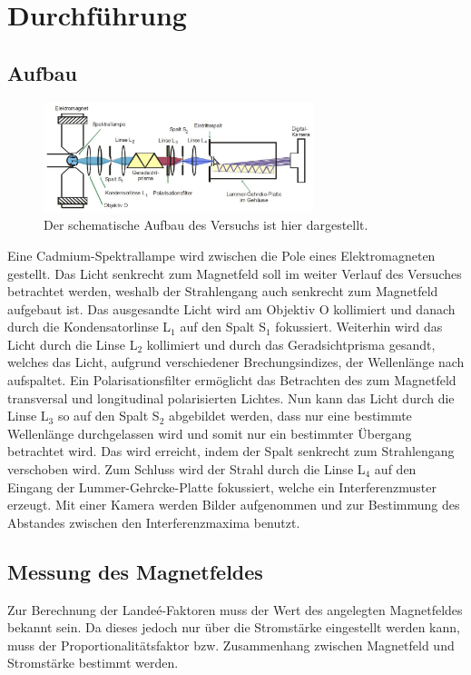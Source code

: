 \newpage
\section{Durchführung}
\label{sec:Durchfuehrung}
\subsection{Aufbau}
    \begin{figure}[h]
        \center
        \includegraphics[width=0.7\textwidth]{bilder/aufbau.jpeg}
        \caption{Der schematische Aufbau des Versuchs ist hier dargestellt. \cite{tu_dortmund_versuchsanleitung_2021}}
        \label{fig:aufbau}
    \end{figure}
    \FloatBarrier

    Eine Cadmium-Spektrallampe wird zwischen die Pole eines Elektromagneten gestellt.
    Das Licht senkrecht zum Magnetfeld soll im weiter Verlauf des Versuches betrachtet werden, weshalb der Strahlengang auch senkrecht zum Magnetfeld aufgebaut ist.
    Das ausgesandte Licht wird am Objektiv O kollimiert und danach durch die Kondensatorlinse L$_1$ auf den Spalt S$_1$ fokussiert.
    Weiterhin wird das Licht durch die Linse L$_2$ kollimiert und durch das Geradsichtprisma gesandt, welches das Licht, aufgrund verschiedener Brechungsindizes, der Wellenlänge nach aufspaltet.
    Ein Polarisationsfilter ermöglicht das Betrachten des zum Magnetfeld transversal und longitudinal polarisierten Lichtes.
    Nun kann das Licht durch die Linse L$_3$ so auf den Spalt S$_2$ abgebildet werden, dass nur eine bestimmte Wellenlänge durchgelassen wird und somit nur ein bestimmter Übergang betrachtet wird.
    Das wird erreicht, indem der Spalt senkrecht zum Strahlengang verschoben wird.
    Zum Schluss wird der Strahl durch die Linse L$_4$ auf den Eingang der Lummer-Gehrcke-Platte fokussiert, welche ein Interferenzmuster erzeugt.
    Mit einer Kamera werden Bilder aufgenommen und zur Bestimmung des Abstandes zwischen den Interferenzmaxima benutzt.

\subsection{Messung des Magnetfeldes}
\label{sec:BFeld}
    Zur Berechnung der Landeé-Faktoren muss der Wert des angelegten Magnetfeldes bekannt sein.
    Da dieses jedoch nur über die Stromstärke eingestellt werden kann, muss der Proportionalitätsfaktor bzw. Zusammenhang zwischen Magnetfeld und Stromstärke bestimmt werden.

